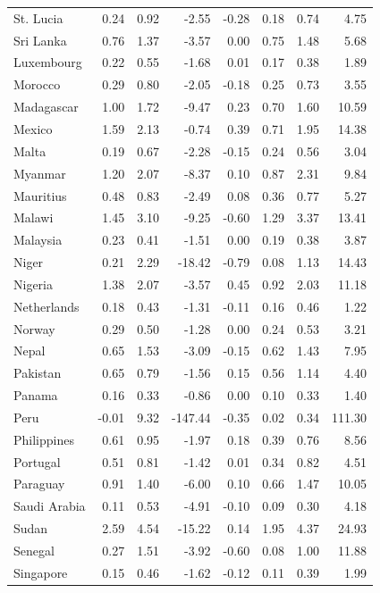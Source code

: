 \begin{tabular}{lrrrrrrr}
St. Lucia & 0.24 & 0.92 & -2.55 & -0.28 & 0.18 & 0.74 & 4.75 \\
Sri Lanka & 0.76 & 1.37 & -3.57 & 0.00 & 0.75 & 1.48 & 5.68 \\
Luxembourg & 0.22 & 0.55 & -1.68 & 0.01 & 0.17 & 0.38 & 1.89 \\
Morocco & 0.29 & 0.80 & -2.05 & -0.18 & 0.25 & 0.73 & 3.55 \\
Madagascar & 1.00 & 1.72 & -9.47 & 0.23 & 0.70 & 1.60 & 10.59 \\
Mexico & 1.59 & 2.13 & -0.74 & 0.39 & 0.71 & 1.95 & 14.38 \\
Malta & 0.19 & 0.67 & -2.28 & -0.15 & 0.24 & 0.56 & 3.04 \\
Myanmar & 1.20 & 2.07 & -8.37 & 0.10 & 0.87 & 2.31 & 9.84 \\
Mauritius & 0.48 & 0.83 & -2.49 & 0.08 & 0.36 & 0.77 & 5.27 \\
Malawi & 1.45 & 3.10 & -9.25 & -0.60 & 1.29 & 3.37 & 13.41 \\
Malaysia & 0.23 & 0.41 & -1.51 & 0.00 & 0.19 & 0.38 & 3.87 \\
Niger & 0.21 & 2.29 & -18.42 & -0.79 & 0.08 & 1.13 & 14.43 \\
Nigeria & 1.38 & 2.07 & -3.57 & 0.45 & 0.92 & 2.03 & 11.18 \\
Netherlands & 0.18 & 0.43 & -1.31 & -0.11 & 0.16 & 0.46 & 1.22 \\
Norway & 0.29 & 0.50 & -1.28 & 0.00 & 0.24 & 0.53 & 3.21 \\
Nepal & 0.65 & 1.53 & -3.09 & -0.15 & 0.62 & 1.43 & 7.95 \\
Pakistan & 0.65 & 0.79 & -1.56 & 0.15 & 0.56 & 1.14 & 4.40 \\
Panama & 0.16 & 0.33 & -0.86 & 0.00 & 0.10 & 0.33 & 1.40 \\
Peru & -0.01 & 9.32 & -147.44 & -0.35 & 0.02 & 0.34 & 111.30 \\
Philippines & 0.61 & 0.95 & -1.97 & 0.18 & 0.39 & 0.76 & 8.56 \\
Portugal & 0.51 & 0.81 & -1.42 & 0.01 & 0.34 & 0.82 & 4.51 \\
Paraguay & 0.91 & 1.40 & -6.00 & 0.10 & 0.66 & 1.47 & 10.05 \\
Saudi Arabia & 0.11 & 0.53 & -4.91 & -0.10 & 0.09 & 0.30 & 4.18 \\
Sudan & 2.59 & 4.54 & -15.22 & 0.14 & 1.95 & 4.37 & 24.93 \\
Senegal & 0.27 & 1.51 & -3.92 & -0.60 & 0.08 & 1.00 & 11.88 \\
Singapore & 0.15 & 0.46 & -1.62 & -0.12 & 0.11 & 0.39 & 1.99 \\

\end{tabular}
